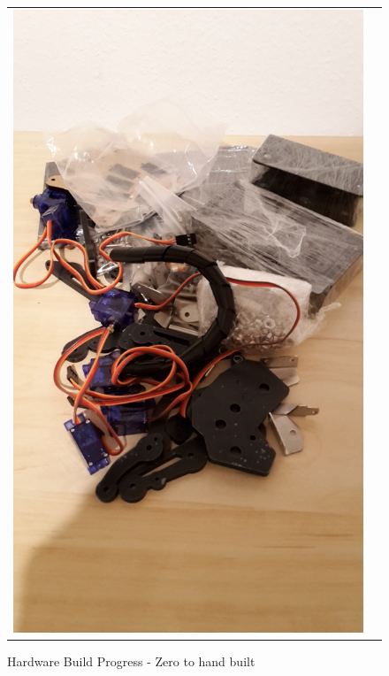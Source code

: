 \documentclass[progress]{cmpreport}
\begin{document}
\begin{figure}[H]
	\centering
	\caption{Hardware Build Progress - Zero to hand built }
	\begin{tabular}{ll}
		\includegraphics[trim=20cm 0cm 22cm 0cm, clip=true, totalheight=0.28\textheight, angle=-90]{photos/start.jpg}
		&

\end{tabular}
\end{figure}
\end{document}
